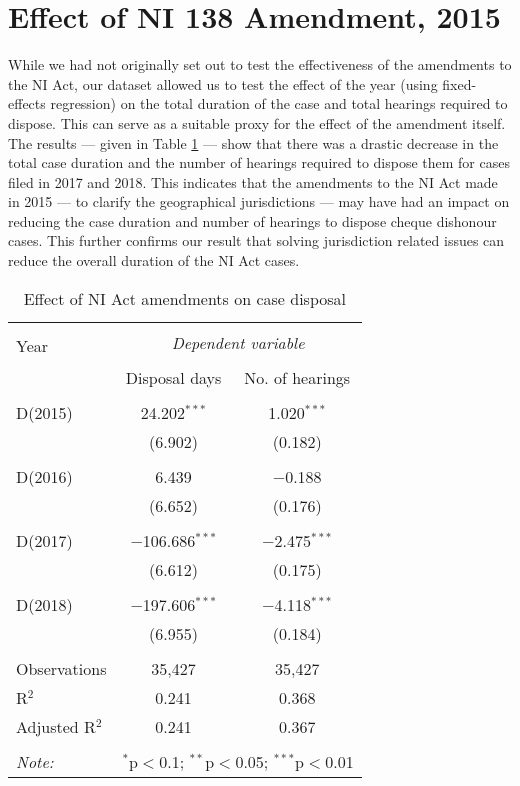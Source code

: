 \section{Effect of NI 138 Amendment, 2015}

While we had not originally set out to test the effectiveness of the amendments to the NI Act, our dataset allowed us to test the effect of the year (using fixed-effects regression) on the total duration of the case and total hearings required to dispose. This can serve as a suitable proxy for the effect of the amendment itself. The results --- given in Table \ref{tab:amendments_effect} --- show that there was a drastic decrease in the total case duration and the number of hearings required to dispose them for cases filed in 2017 and 2018. This indicates that the amendments to the NI Act made in 2015 --- to clarify the geographical jurisdictions --- may have had an impact on reducing the case duration and number of hearings to dispose cheque dishonour cases. This further confirms our result that solving jurisdiction related issues can reduce the overall duration of the NI Act cases.

\begin{table}
 \centering
 \caption{Effect of NI Act amendments on case
 disposal}\label{tab:amendments_effect}
 \footnotesize
 \begin{tabular}{@{\extracolsep{5pt}}lcc}
 \\[-1.8ex] 
 \hline \\[-1.8ex] 
 \multirow{2}{*}{Year} & \multicolumn{2}{c}{\textit{Dependent variable}} \\ 
 \cline{2-3} 
 \\[-1.8ex] & Disposal days & No. of hearings \\ 
 \hline \\[-1.8ex] 
 D(2015) & 24.202$^{***}$ & 1.020$^{***}$ \\ 
 & (6.902) & (0.182) \\ 
 & & \\ 
 D(2016) & 6.439 & $-$0.188 \\ 
 & (6.652) & (0.176) \\ 
 & & \\ 
 D(2017) & $-$106.686$^{***}$ & $-$2.475$^{***}$ \\ 
 & (6.612) & (0.175) \\ 
 & & \\ 
 D(2018) & $-$197.606$^{***}$ & $-$4.118$^{***}$ \\ 
 & (6.955) & (0.184) \\
 \hline \\[-1.8ex] 
 Observations & 35,427 & 35,427 \\ 
 R$^{2}$ & 0.241 & 0.368 \\ 
 Adjusted R$^{2}$ & 0.241 & 0.367 \\ 
 \hline \\[-1.8ex] 
 \textit{Note:} & \multicolumn{2}{r}{$^{*}$p$<$0.1; $^{**}$p$<$0.05; $^{***}$p$<$0.01} \\ 
 \end{tabular} 
\end{table}

